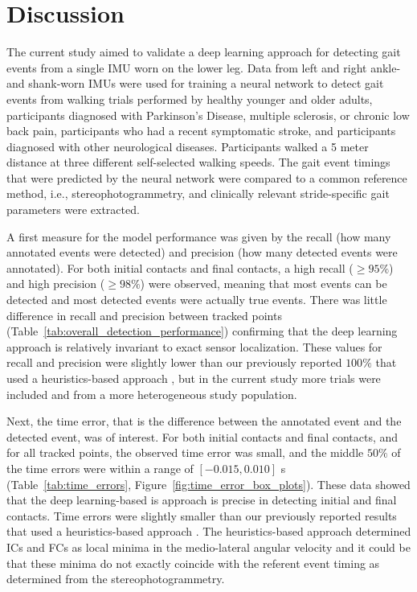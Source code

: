 \documentclass[sensors,article,submit,pdftex,moreauthors]{Definitions/mdpi}
\begin{document}
\section{Discussion}
The current study aimed to validate a deep learning approach for detecting gait events from a single IMU worn on the lower leg. Data from left and right ankle- and shank-worn IMUs were used for training a neural network to detect gait events from walking trials performed by healthy younger and older adults, participants diagnosed with Parkinson's Disease, multiple sclerosis, or chronic low back pain, participants who had a recent symptomatic stroke, and participants diagnosed with other neurological diseases. Participants walked a 5 meter distance at three different self-selected walking speeds. The gait event timings that were predicted by the neural network were compared to a common reference method, i.e., stereophotogrammetry, and clinically relevant stride-specific gait parameters were extracted. 

A first measure for the model performance was given by the recall (how many annotated events were detected) and precision (how many detected events were annotated). For both initial contacts and final contacts, a high recall ($\ge 95\%$) and high precision ($\ge 98\%$) were observed, meaning that most events can be detected and most detected events were actually true events. There was little difference in recall and precision between tracked points (Table~\ref{tab:overall_detection_performance}) confirming that the deep learning approach is relatively invariant to exact sensor localization. These values for recall and precision were slightly lower than our previously reported $100 \%$ \cite{Romijnders2021} that used a heuristics-based approach \cite{Salarian2004}, but in the current study more trials were included and from a more heterogeneous study population.

Next, the time error, that is the difference between the annotated event and the detected event, was of interest. For both initial contacts and final contacts, and for all tracked points, the observed time error was small, and the middle $50\%$ of the time errors were within a range of $\left[-0.015,0.010\right]$ s (Table~\ref{tab:time_errors}, Figure~\ref{fig:time_error_box_plots}). These data showed that the deep learning-based is approach is precise in detecting initial and final contacts. Time errors were slightly smaller than our previously reported results \cite{Romijnders2021} that used a heuristics-based approach \cite{Salarian2004}. The heuristics-based approach determined ICs and FCs as local minima in the medio-lateral angular velocity \cite{Salarian2004} and it could be that these minima do not exactly coincide with the referent event timing as determined from the stereophotogrammetry. 
\end{document}
